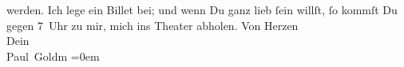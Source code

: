 \begin{ledgroupsized}[t]{13cm}
               werden. Ich lege ein Billet bei; und wenn Du ganz lieb ſein willſt, ſo kommſt Du
               gegen 7 Uhr zu mir, mich ins Theater abholen.\pend
           \pstart
           Von Herzen {\\[\baselineskip]}Dein {\\[\baselineskip]}\spacefill\mbox{Paul Goldm}\pend
           \leftskip=0em{}
         
         \endnumbering{}\end{ledgroupsized}  \newcommand{\dateiname}{L03226}\newcommand{\titel}{Paul Goldmann an Arthur Schnitzler, 12. 10. [1902]}\newcommand{\editorInnen}{Martin Anton Müller und Laura Untner}
      